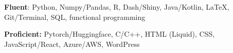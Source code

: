  \textbf{Fluent}: Python, Numpy/Pandas, R, Dash/Shiny, Java/Kotlin, \LaTeX, Git/Terminal, SQL, functional programming

 \textbf{Proficient:} Pytorch/Huggingface, C/C++, HTML (Liquid), CSS, JavaScript/React, Azure/AWS, WordPress